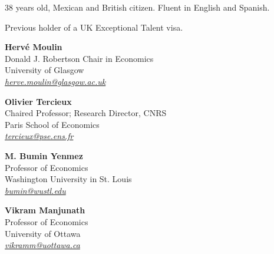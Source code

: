 \documentclass[11pt,a4paper]{article}
\begin{document}



38 years old, Mexican and British citizen. Fluent in English and Spanish.

Previous holder of a UK Exceptional Talent visa.


\begin{minipage}{\textwidth}

\noindent
\begin{minipage}[t]{0.48\textwidth}
{\bf Hervé Moulin}\\
Donald J. Robertson Chair in Economics\\
University of Glasgow\\
\href{mailto:herve.moulin@glasgow.ac.uk}{\emph{herve.moulin@glasgow.ac.uk}}
\end{minipage}\hfill
\begin{minipage}[t]{0.48\textwidth}
{\bf Olivier Tercieux}\\
Chaired Professor; Research Director, CNRS\\
Paris School of Economics\\
\href{mailto:tercieux@pse.ens.fr}{\emph{tercieux@pse.ens.fr}}
\end{minipage}

\vspace{0.25cm}

\noindent
\begin{minipage}[t]{0.48\textwidth}
{\bf M. Bumin Yenmez}\\
Professor of Economics\\
Washington University in St. Louis\\
\href{mailto:bumin@wustl.edu}{\emph{bumin@wustl.edu}}
\end{minipage}\hfill
\begin{minipage}[t]{0.48\textwidth}
{\bf Vikram Manjunath}\\
Professor of Economics\\
University of Ottawa\\
\href{mailto:vikramm@uottawa.ca}{\emph{vikramm@uottawa.ca}}
\end{minipage}
\end{minipage}
\end{document}

